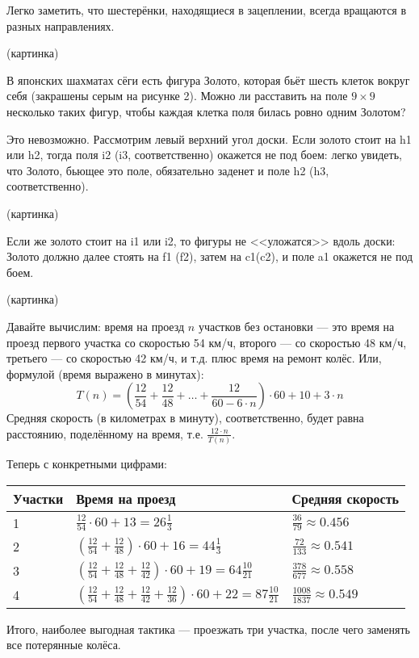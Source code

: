 \begin{itemize}
\itA Легко заметить, что шестерёнки, находящиеся в зацеплении, всегда вращаются в 
разных направлениях.

(картинка)

\itB В японских шахматах сёги есть фигура Золото, которая бьёт шесть клеток вокруг себя
 (закрашены серым на рисунке 2). Можно ли расставить на поле $9 \times 9$ несколько таких 
фигур, чтобы каждая клетка поля билась ровно одним Золотом?

Это невозможно. Рассмотрим левый верхний угол доски. Если золото стоит на h1 или h2, 
тогда поля i2 (i3, соответственно) окажется не под боем: легко увидеть, что Золото,
бьющее это поле, обязательно заденет и поле h2 (h3, соответственно).

(картинка)

Если же золото стоит на i1 или i2, то фигуры не <<уложатся>> вдоль доски: Золото должно
далее стоять на f1 (f2), затем на c1(c2), и поле a1 окажется не под боем.

(картинка)

\itC Давайте вычислим: время на проезд $n$ участков без остановки --- 
это время на проезд первого участка 
со скоростью 54 км/ч, второго --- со скоростью 48 км/ч, третьего --- со скоростью 42 км/ч, и т.д.
плюс время на ремонт колёс. Или, формулой (время выражено в минутах):
 $$T(n) = \left(\frac{12}{54} + \frac{12}{48} + \dots + \frac{12}{60 - 6 \cdot n}\right) \cdot 60 + 10 + 3 \cdot n$$
Средняя скорость (в километрах в минуту), соответственно, будет равна расстоянию, поделённому на время, т.е.
$\frac{12 \cdot n}{T(n)}$.

Теперь с конкретными цифрами:

\begin{tabular}{lll}
Участки & Время на проезд & Средняя скорость \\
\hline
1	& $\frac{12}{54} \cdot 60 + 13 = 26\frac{1}{3}$ & $\frac{36}{79} \approx 0.456$ \\
2	& $\left(\frac{12}{54} + \frac{12}{48}\right) \cdot 60 + 16 = 44\frac{1}{3}$ & $\frac{72}{133} \approx 0.541$ \\
3	& $\left(\frac{12}{54} + \frac{12}{48} + \frac{12}{42}\right) \cdot 60 + 19 = 64\frac{10}{21}$ & $\frac{378}{677} \approx 0.558$ \\
4	& $\left(\frac{12}{54} + \frac{12}{48} + \frac{12}{42} + \frac{12}{36}\right) \cdot 60 + 22 = 87\frac{10}{21}$ & $\frac{1008}{1837} \approx 0.549$
\end{tabular}

Итого, наиболее выгодная тактика --- проезжать три участка, после чего заменять все потерянные колёса.
\end{itemize}